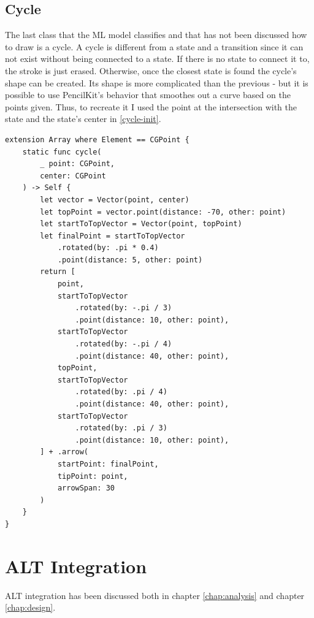 \subsection{Cycle}

The last class that the ML model classifies and that has not been discussed how to draw is a cycle. A cycle is different from a state and a transition since it can not exist without being connected to a state. If there is no state to connect it to, the stroke is just erased. Otherwise, once the closest state is found the cycle's shape can be created. Its shape is more complicated than the previous - but it is possible to use PencilKit's behavior that smoothes out a curve based on the points given. Thus, to recreate it I used the point at the intersection with the state and the state's center in \ref{cycle-init}.

\begin{lstlisting}[caption=Cycle stroke, label=cycle-init]
extension Array where Element == CGPoint {
    static func cycle(
        _ point: CGPoint,
        center: CGPoint
    ) -> Self {
        let vector = Vector(point, center)
        let topPoint = vector.point(distance: -70, other: point)
        let startToTopVector = Vector(point, topPoint)
        let finalPoint = startToTopVector
            .rotated(by: .pi * 0.4)
            .point(distance: 5, other: point)
        return [
            point,
            startToTopVector
                .rotated(by: -.pi / 3)
                .point(distance: 10, other: point),
            startToTopVector
                .rotated(by: -.pi / 4)
                .point(distance: 40, other: point),
            topPoint,
            startToTopVector
                .rotated(by: .pi / 4)
                .point(distance: 40, other: point),
            startToTopVector
                .rotated(by: .pi / 3)
                .point(distance: 10, other: point),
        ] + .arrow(
            startPoint: finalPoint,
            tipPoint: point,
            arrowSpan: 30
        )
    }
}
\end{lstlisting}

\section{ALT Integration}

ALT integration has been discussed both in chapter \ref{chap:analysis} and chapter \ref{chap:design}. 

